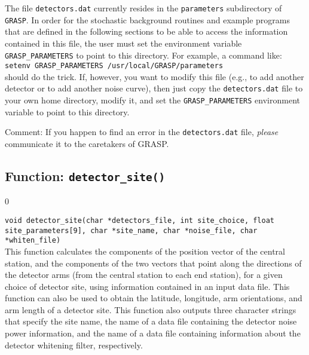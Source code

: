 
The file {\tt detectors.dat} currently resides in the
{\tt parameters} subdirectory of {\tt GRASP}.
In order for the stochastic background routines and example
programs that are defined in the following sections to be able to
access the information contained in this file, the user must set
the environment variable {\tt GRASP\_PARAMETERS} to point to this
directory.
For example, a command like:\\
{\tt setenv GRASP\_PARAMETERS /usr/local/GRASP/parameters}\\
should do the trick.
If, however, you want to modify this file (e.g., to add another 
detector or to add another noise curve), then just copy the 
{\tt detectors.dat} file to your own home directory, modify it, 
and set the {\tt GRASP\_PARAMETERS} environment variable to point 
to this directory. 
%
\begin{description}
\item{Comment:}
If you happen to find an error in the {\tt detectors.dat} file, 
{\it please} communicate it to the caretakers of GRASP.
\end{description}

\clearpage

\subsection{Function: {\tt detector\_site()}}
\label{subsec:detector_site}
\setcounter{equation}0

{\tt void detector\_site(char *detectors\_file, int site\_choice, 
float site\_parameters[9], char *site\_name, char *noise\_file, 
char *whiten\_file)}\\
%
This function calculates the components of the position vector of the 
central station, and the components of the two vectors that point
along the directions of the detector arms (from the central station to 
each end station), for a given choice of detector site, using information 
contained in an input data file.  This function can also be used to obtain
the latitude, longitude, arm orientations, and arm length of a detector site.
This function also outputs three character strings that
specify the site name, the name of a data file containing the detector noise 
power information, and the name of a data file containing information about 
the detector whitening filter, respectively.

